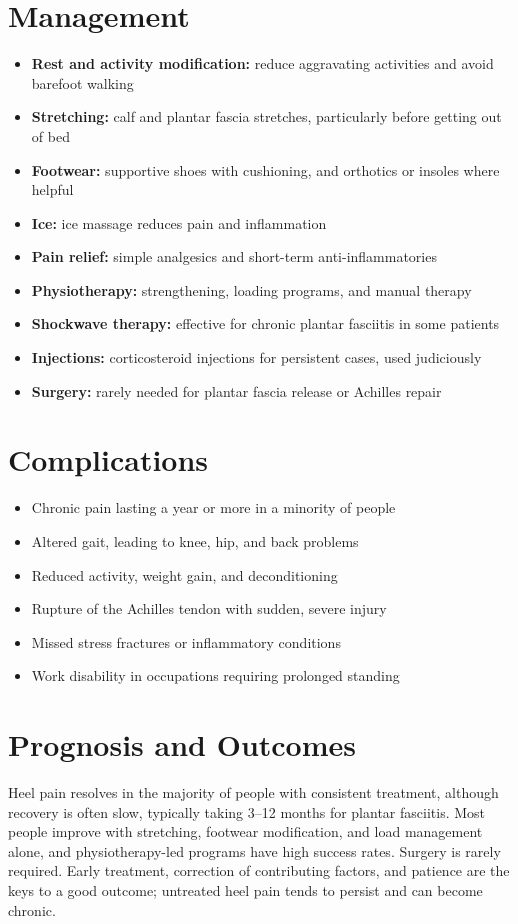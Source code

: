 \section*{Management}
\begin{itemize}
    \item \textbf{Rest and activity modification:} reduce aggravating activities and avoid barefoot walking
    \item \textbf{Stretching:} calf and plantar fascia stretches, particularly before getting out of bed
    \item \textbf{Footwear:} supportive shoes with cushioning, and orthotics or insoles where helpful
    \item \textbf{Ice:} ice massage reduces pain and inflammation
    \item \textbf{Pain relief:} simple analgesics and short-term anti-inflammatories
    \item \textbf{Physiotherapy:} strengthening, loading programs, and manual therapy
    \item \textbf{Shockwave therapy:} effective for chronic plantar fasciitis in some patients
    \item \textbf{Injections:} corticosteroid injections for persistent cases, used judiciously
    \item \textbf{Surgery:} rarely needed for plantar fascia release or Achilles repair
\end{itemize}

\section*{Complications}
\begin{itemize}
    \item Chronic pain lasting a year or more in a minority of people
    \item Altered gait, leading to knee, hip, and back problems
    \item Reduced activity, weight gain, and deconditioning
    \item Rupture of the Achilles tendon with sudden, severe injury
    \item Missed stress fractures or inflammatory conditions
    \item Work disability in occupations requiring prolonged standing
\end{itemize}

\section*{Prognosis and Outcomes}
Heel pain resolves in the majority of people with consistent treatment, although recovery is often slow, typically taking 3--12 months for plantar fasciitis. Most people improve with stretching, footwear modification, and load management alone, and physiotherapy-led programs have high success rates. Surgery is rarely required. Early treatment, correction of contributing factors, and patience are the keys to a good outcome; untreated heel pain tends to persist and can become chronic.

